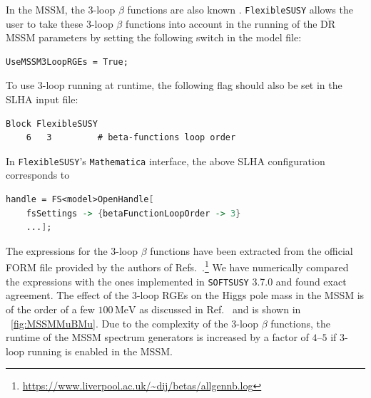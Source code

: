 \documentclass[final,3p,11pt,pdflatex]{elsarticle}
\makeatletter
\newcommand{\fs}{\texttt{FlexibleSUSY}\@\xspace}
\newcommand{\softsusy}{\texttt{SOFTSUSY}\@\xspace}
\newcommand{\mathematica}{\texttt{Ma\-the\-ma\-ti\-ca}\xspace}
\newcommand{\ol}[1]{\overline{#1}}
\newcommand{\DRbar}{\ensuremath{\ol{\text{DR}}}\xspace}
\newcommand{\unit}[1]{\,\text{#1}}      %
\newcommand{\figref}[1]{\figurename~\ref{#1}}
\makeatother
\begin{document}
In the MSSM, the 3-loop $\beta$ functions are also known
\cite{Jack:2003sx,Jack:2004ch}.  \fs allows the user to take these 3-loop
$\beta$ functions into account in the running of the \DRbar MSSM parameters by
setting the following switch in the model file:
%
\begin{lstlisting}
UseMSSM3LoopRGEs = True;
\end{lstlisting}
%
To use 3-loop running at runtime, the following flag should also be set in
the SLHA input file:
%
\\\begin{minipage}{\linewidth}
\begin{lstlisting}
Block FlexibleSUSY
    6   3         # beta-functions loop order
\end{lstlisting}
\end{minipage}
%
In \fs's \mathematica interface, the above SLHA configuration
corresponds to
%
\begin{lstlisting}[language=Mathematica]
handle = FS<model>OpenHandle[
    fsSettings -> {betaFunctionLoopOrder -> 3}
    ...];
\end{lstlisting}
%
The expressions for the 3-loop $\beta$ functions have been extracted
from the official FORM file provided by the authors of
Refs.~\cite{Jack:2003sx,Jack:2004ch}.\footnote{\url{https://www.liverpool.ac.uk/~dij/betas/allgennb.log}}
We have numerically compared the expressions with the ones implemented
in \softsusy 3.7.0 \cite{Allanach:2014nba} and found exact agreement.
%
The effect of the 3-loop RGEs on the Higgs pole mass in the MSSM is of
the order of a few $100\unit{MeV}$ as discussed in
Ref.~\cite{Allanach:2014nba} and is shown in \figref{fig:MSSMMuBMu}.
%
Due to the complexity of the 3-loop $\beta$ functions, the runtime of
the MSSM spectrum generators is increased by a factor of $4$--$5$ if
3-loop running is enabled in the MSSM\@.
\end{document}
